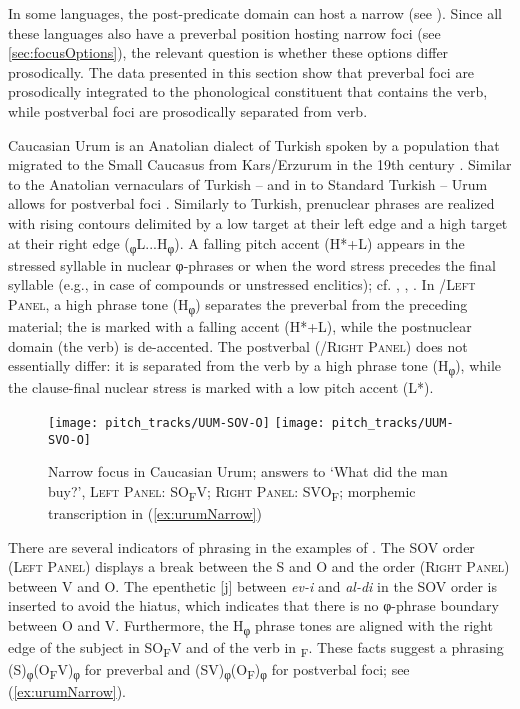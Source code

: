 \documentclass[output=paper,colorlinks,citecolor=brown]{langscibook}
\begin{document}
In some languages, the post-predicate domain can host a narrow  (see ). Since all these languages also have a preverbal position hosting narrow foci (see \ref{sec:focusOptions}), the relevant question is whether these options differ prosodically. The data presented in this section show that preverbal foci are prosodically integrated to the phonological constituent that contains the verb, while postverbal foci are prosodically separated from verb.

Caucasian Urum is an Anatolian dialect of Turkish spoken by a population that migrated to the Small Caucasus from Kars/Erzurum in the 19th century \citep[]{skopeteas_caucasian_2016}. Similar to the Anatolian vernaculars of Turkish -- and in  to Standard Turkish -- Urum allows for postverbal foci \citep[]{schroter_information_2017}{}. Similarly to Turkish, prenuclear phrases are realized with rising contours delimited by a low target at their left edge and a high target at their right edge (\textsubscript{φ}L...H\textsubscript{φ}). A falling pitch accent (H*+L) appears in the stressed syllable in nuclear φ-phrases or when the word stress precedes the final syllable (e.g., in case of compounds or unstressed enclitics); cf. \citet[93]{kamali_topics_2011}, \citet[]{gunes_role_2013}, \citet[250--257]{fery_intonation_2018}. In /\textsc{Left Panel}, a high phrase tone (H\textsubscript{φ}) separates the preverbal  from the preceding material; the  is marked with a falling accent (H*+L), while the postnuclear domain (the verb) is de-accented. The postverbal  (/\textsc{Right Panel}) does not essentially differ: it is separated from the verb by a high phrase tone (H\textsubscript{φ}), while the clause-final nuclear stress is marked with a low pitch accent (L*).

\begin{figure}
    \texttt{[image: pitch\_tracks/UUM-SOV-O]}
    \texttt{[image: pitch\_tracks/UUM-SVO-O]}
    \caption{Narrow focus in Caucasian Urum; answers to ‘What did the man buy?’, \textsc{Left Panel}: SO\textsubscript{F}V; \textsc{Right Panel}: SVO\textsubscript{F}; morphemic transcription in (\ref{ex:urumNarrow})}
    \label{fig:urumNarrow}
\end{figure}

There are several indicators of phrasing in the examples of . The SOV order (\textsc{Left Panel}) displays a break between the S and O and the  order (\textsc{Right Panel}) between V and O. The epenthetic [j] between \textit{ev-i} and \textit{al-di} in the SOV order is inserted to avoid the hiatus, which indicates that there is no φ-phrase boundary between O and V. Furthermore, the H\textsubscript{φ} phrase tones are aligned with the right edge of the subject in SO\textsubscript{F}V and of the verb in \textsubscript{F}. These facts suggest a phrasing (S)\textsubscript{φ}(O\textsubscript{F}V)\textsubscript{φ} for preverbal and (SV)\textsubscript{φ}(O\textsubscript{F})\textsubscript{φ} for postverbal foci; see (\ref{ex:urumNarrow}).
\end{document}
